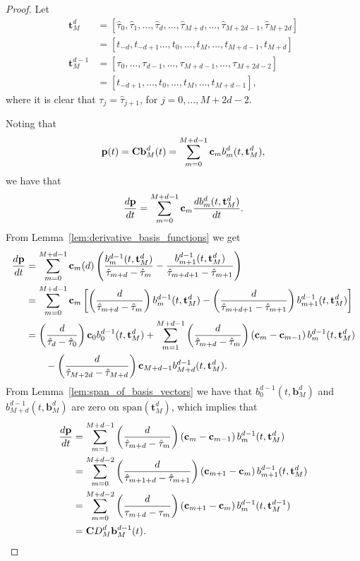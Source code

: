 \begin{proof}
Let
\begin{align*}
\mathbf{t}_M^{d} &= [\hat{\tau}_{0}, \hat{\tau}_{1}, \dots, \hat{\tau}_{d}, \dots, \hat{\tau}_{M+d}, \dots, \hat{\tau}_{M+2d-1}, \hat{\tau}_{M+2d}] \\
				   &= [t_{-d}, t_{-d+1} \dots, t_{0}, \dots, t_M, \dots, t_{M+d-1}, t_{M+d}] \\
\mathbf{t}_M^{d-1}   &= [\tau_{0}, \dots, \tau_{d-1}, \dots, \tau_{M+d-1}, \dots, \tau_{M+2d-2}] \\
				   &= [t_{-d+1}, \dots, t_{0}, \dots, t_M, \dots, t_{M+d-1}],
\end{align*}	
where it is clear that $\tau_j = \hat{\tau}_{j+1}$, for $j=0,\dots,M+2d-2$.

Noting that
\[
\mathbf{p}(t) = \mathbf{C} \mathbf{b}_M^d(t)
              = \sum_{m=0}^{M+d-1} \mathbf{c}_m b_m^d(t,  \mathbf{t}_M^d),
\]
we have that
\[
\frac{d\mathbf{p}}{dt} = \sum_{m=0}^{M+d-1} \mathbf{c}_m \frac{d b_m^d(t,  \mathbf{t}_M^d)}{dt}.
\]
From Lemma~\ref{lem:derivative_basis_functions} we get
\begin{align*}
\frac{d\mathbf{p}}{dt} &= \sum_{m=0}^{M+d-1}  \mathbf{c}_m (d) \left(\frac{b_m^{d-1}(t,  \mathbf{t}_M^d)}{\hat\tau_{m+d}-\hat\tau_m} - \frac{b_{m+1}^{d-1}(t,  \mathbf{t}_M^d)}{\hat\tau_{m+d+1}-\hat\tau_{m+1}} \right) \\
&= \sum_{m=0}^{M+d-1} \mathbf{c}_m \left[ \left(\frac{d}{\hat\tau_{m+d}-\hat\tau_m}\right) b_m^{d-1}(t,  \mathbf{t}_M^d) - \left(\frac{d}{\hat\tau_{m+d+1}-\hat\tau_{m+1}}\right)  b_{m+1}^{d-1}(t,  \mathbf{t}_M^d) \right] \\
&= \left(\frac{d}{\hat\tau_{d}-\hat\tau_0}\right)\mathbf{c}_0 b_0^{d-1}(t,  \mathbf{t}_M^d) + \sum_{m=1}^{M+d-1} \left(\frac{d}{\hat\tau_{m+d}-\hat\tau_m}\right) \left(  \mathbf{c}_m - \mathbf{c}_{m-1}  \right) b_m^{d-1}(t,  \mathbf{t}_M^d) \\
&\qquad - \left(\frac{d}{\hat\tau_{M+2d}-\hat\tau_{M+d}}\right)\mathbf{c}_{M+d-1}b_{M+d}^{d-1}(t, \mathbf{t}_M^d).
\end{align*}
From Lemma~\ref{lem:span_of_basis_vectors} we have that $b_0^{d-1}(t, \mathbf{b}_M^d)$ and $b_{M+d}^{d-1}(t, \mathbf{b}_M^d)$ are zero on $\text{span}(\mathbf{t}_M^d)$, which implies that 
\begin{align*}
	\frac{d\mathbf{p}}{dt} 
		&= \sum_{m=1}^{M+d-1} \left(\frac{d}{\hat\tau_{m+d}-\hat\tau_m}\right) \left(  \mathbf{c}_m - \mathbf{c}_{m-1}  \right) b_m^{d-1}(t,  \mathbf{t}_M^d) \\
		&= \sum_{m=0}^{M+d-2} \left(\frac{d}{\hat\tau_{m+1+d}-\hat\tau_{m+1}}\right) \left(  \mathbf{c}_{m+1} - \mathbf{c}_{m}  \right) b_{m+1}^{d-1}(t,  \mathbf{t}_M^d) \\
		&= \sum_{m=0}^{M+d-2} \left(\frac{d}{\tau_{m+d}-\tau_{m}}\right) \left(  \mathbf{c}_{m+1} - \mathbf{c}_{m}  \right) b_{m}^{d-1}(t,  \mathbf{t}_M^{d-1}) \\	
		&= \mathbf{C} D_M^d \mathbf{b}_M^{d-1}(t).	
\end{align*}
\end{proof}

